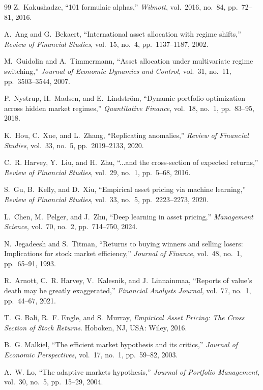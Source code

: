 \documentclass{ieeeaccess}
\begin{document}
\begin{thebibliography}{99}
Z.~Kakushadze, ``101 formulaic alphas,'' \textit{Wilmott}, vol.~2016, no.~84, pp.~72--81, 2016.

A.~Ang and G.~Bekaert, ``International asset allocation with regime shifts,'' \textit{Review of Financial Studies}, vol.~15, no.~4, pp.~1137--1187, 2002.

M.~Guidolin and A.~Timmermann, ``Asset allocation under multivariate regime switching,'' \textit{Journal of Economic Dynamics and Control}, vol.~31, no.~11, pp.~3503--3544, 2007.

P.~Nystrup, H.~Madsen, and E.~Lindstr{\"o}m, ``Dynamic portfolio optimization across hidden market regimes,'' \textit{Quantitative Finance}, vol.~18, no.~1, pp.~83--95, 2018.

K.~Hou, C.~Xue, and L.~Zhang, ``Replicating anomalies,'' \textit{Review of Financial Studies}, vol.~33, no.~5, pp.~2019--2133, 2020.

C.~R. Harvey, Y.~Liu, and H.~Zhu, ``...and the cross-section of expected returns,'' \textit{Review of Financial Studies}, vol.~29, no.~1, pp.~5--68, 2016.

S.~Gu, B.~Kelly, and D.~Xiu, ``Empirical asset pricing via machine learning,'' \textit{Review of Financial Studies}, vol.~33, no.~5, pp.~2223--2273, 2020.

L.~Chen, M.~Pelger, and J.~Zhu, ``Deep learning in asset pricing,'' \textit{Management Science}, vol.~70, no.~2, pp.~714--750, 2024.

N.~Jegadeesh and S.~Titman, ``Returns to buying winners and selling losers: Implications for stock market efficiency,'' \textit{Journal of Finance}, vol.~48, no.~1, pp.~65--91, 1993.

R.~Arnott, C.~R. Harvey, V.~Kalesnik, and J.~Linnainmaa, ``Reports of value's death may be greatly exaggerated,'' \textit{Financial Analysts Journal}, vol.~77, no.~1, pp.~44--67, 2021.

T.~G. Bali, R.~F. Engle, and S.~Murray, \textit{Empirical Asset Pricing: The Cross Section of Stock Returns}. Hoboken, NJ, USA: Wiley, 2016.

B.~G. Malkiel, ``The efficient market hypothesis and its critics,'' \textit{Journal of Economic Perspectives}, vol.~17, no.~1, pp.~59--82, 2003.

A.~W. Lo, ``The adaptive markets hypothesis,'' \textit{Journal of Portfolio Management}, vol.~30, no.~5, pp.~15--29, 2004.


\end{thebibliography}
\end{document}
